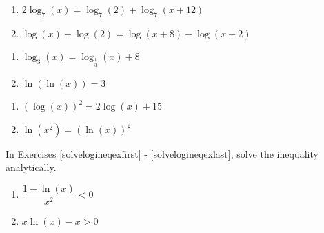 \begin{multicols}{2}
\begin{enumerate}
\setcounter{enumi}{\value{HW}}

\item $2\log_{7}(x) = \log_{7}(2) + \log_{7}(x+12)$

\item $\log(x) - \log(2) = \log(x+8)  - \log(x+2)$

\setcounter{HW}{\value{enumi}}
\end{enumerate}
\end{multicols}

\begin{multicols}{2}
\begin{enumerate}
\setcounter{enumi}{\value{HW}}

\item $\log_{3}(x) = \log_{\frac{1}{3}}(x) + 8$

\item $\ln(\ln(x)) = 3$

\setcounter{HW}{\value{enumi}}
\end{enumerate}
\end{multicols}

\begin{multicols}{2}
\begin{enumerate}
\setcounter{enumi}{\value{HW}}

\item $\left(\log(x)\right)^2=2\log(x)+15$

\item $\ln(x^{2}) = (\ln(x))^{2}$ \label{solvelogeqexlast}

\setcounter{HW}{\value{enumi}}
\end{enumerate}
\end{multicols}


In Exercises \ref{solvelogineqexfirst} - \ref{solvelogineqexlast}, solve the inequality analytically.

\begin{multicols}{2}
\begin{enumerate}
\setcounter{enumi}{\value{HW}}

\item $\dfrac{1 - \ln(x)}{x^{2}} < 0$ \label{solvelogineqexfirst}
\item $x\ln(x) - x > 0$ 


\setcounter{HW}{\value{enumi}}
\end{enumerate}
\end{multicols}

